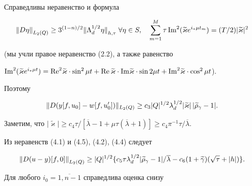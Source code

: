Справедливы неравенство и формула


$$


{\ver D\eta\ver}_{L_2(Q)}\ge 3^{(1-n)/2}{\ver\Lambda_d^{1/2}\eta


\ver}_{h,\tau}\; \forall \eta\in S,\quad


\sum_{m=1}^M\tau\text{\,Im}^2(\widetilde\varkappa


e^{i_*\mu t_m})=(T/2)\vert\widetilde\varkappa\vert^2


$$


(мы учли правое неравенство (2.2), а также  равенство


$\text{Im}^2(\widetilde\varkappa e^{i_*\mu t})=


\text{Re}^2\widetilde\varkappa\cdot\sin^2\mu t+\text{Re\,}


\widetilde\varkappa\cdot


\text{Im}\widetilde\varkappa\cdot\sin 2\mu t+


\text{Im}^2\widetilde\varkappa\cdot\cos^2 \mu t$).


Поэтому


\begin{equation}


\ver D(y[f,u_0]-w[f,u_0^\prime])\ver_{L_2(Q)}\ge c_3\vert Q\vert^{1/2}


\lambda_d^{1/2}\vert\widetilde\varkappa\vert\,\vert


\widetilde\rho_\gamma-1\vert.


\end{equation}


Заметим, что $\vert\widetilde\varkappa\vert\ge c_4\tau/


[\overline\lambda-1+\mu\tau(\overline\lambda+1)]\ge c_4\pi^{-1}\tau/


\overline\lambda$.





Из неравенств (4.1) и (4.5), (4.2), (4.4) следует


\begin{equation}


\nord u y f 0\ge \vert Q\vert^{1/2}\{c_5\tau\lambda_d^{1/2}


\vert\widetilde\rho_\gamma-1\vert/\overline\lambda-


c_6(1+\widetilde\gamma)(\sqrt\tau+


\vert h\vert)\}.


\end{equation}


Для любого $i_0=\overline{1,n-1}$ справедлива оценка снизу


